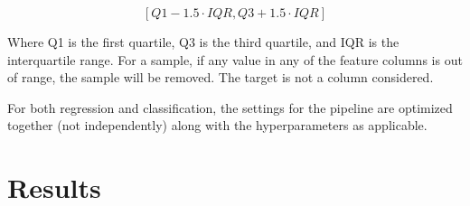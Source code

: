 \documentclass[12pt, letterpaper]{article}
\begin{document}
$$
[Q1 - 1.5 \cdot IQR, Q3 + 1.5 \cdot IQR]
$$

Where Q1 is the first quartile, Q3 is the third quartile, and IQR is the interquartile range. For a sample, if any value in any of the feature columns is out of range, the sample will be removed. The target is not a column considered.

For both regression and classification, the settings for the pipeline are optimized together (not independently) along with the hyperparameters as applicable.

\section{Results} %

\begin{table}[H]
\centering
\caption{Best and default regression pipelines explored, and their performance}
\label{table_of_prominence_reg}
\end{table}

\begin{table}[H]
\centering
\caption{Best and default classification pipelines explored, and their performance}
\label{table_of_prominence_cls}
\end{table}
\end{document}
